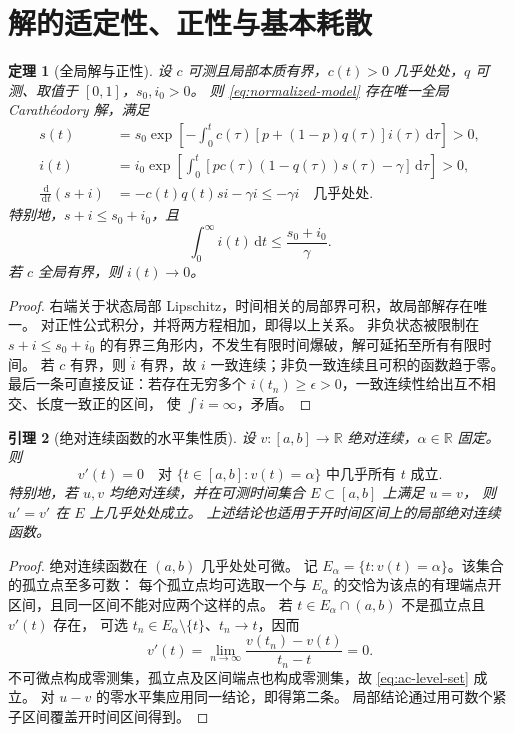 \documentclass[11pt,a4paper,UTF8]{ctexart}
\newtheorem{theorem}{定理}[section]
\newtheorem{lemma}[theorem]{引理}
\theoremstyle{definition}
\newcommand{\R}{\mathbb R}
\newcommand{\dd}{\,\mathrm d}
\begin{document}
\section{解的适定性、正性与基本耗散}
\label{sec:wellposed}
\begin{theorem}[全局解与正性]
\label{thm:wellposed}
设 $c$ 可测且局部本质有界，$c(t)>0$ 几乎处处，$q$ 可测、取值于 $[0,1]$，$s_0,i_0>0$。
则 \eqref{eq:normalized-model} 存在唯一全局 Carath\'eodory 解，满足
\begin{align}
s(t)&=s_0\exp\left[-\int_0^t c(\tau)[p+(1-p)q(\tau)]i(\tau)\dd\tau\right]>0,
\label{eq:s-positive}\\
i(t)&=i_0\exp\left[\int_0^t[pc(\tau)(1-q(\tau))s(\tau)-\gamma]\dd\tau\right]>0,
\label{eq:i-positive}\\
\frac{\dd}{\dd t}(s+i)&=-c(t)q(t)si-\gamma i\le-\gamma i\quad\text{几乎处处}.
\label{eq:sum-decay}
\end{align}
特别地，$s+i\le s_0+i_0$，且
\begin{equation}
\int_0^\infty i(t)\dd t\le\frac{s_0+i_0}{\gamma}.
\label{eq:i-integrable}
\end{equation}
若 $c$ 全局有界，则 $i(t)\to0$。
\end{theorem}
\begin{proof}
右端关于状态局部 Lipschitz，时间相关的局部界可积，故局部解存在唯一。
对正性公式积分，并将两方程相加，即得以上关系。
非负状态被限制在 $s+i\le s_0+i_0$ 的有界三角形内，不发生有限时间爆破，解可延拓至所有有限时间。
若 $c$ 有界，则 $\dot i$ 有界，故 $i$ 一致连续；非负一致连续且可积的函数趋于零。
最后一条可直接反证：若存在无穷多个 $i(t_n)\ge\epsilon>0$，一致连续性给出互不相交、长度一致正的区间，
使 $\int i=\infty$，矛盾。
\end{proof}

\begin{lemma}[绝对连续函数的水平集性质]
\label{lem:ac-level-set}
设 $v:[a,b]\to\R$ 绝对连续，$\alpha\in\R$ 固定。
则
\begin{equation}
v'(t)=0\quad\text{对 }\{t\in[a,b]:v(t)=\alpha\}\text{ 中几乎所有 }t\text{ 成立}.
\label{eq:ac-level-set}
\end{equation}
特别地，若 $u,v$ 均绝对连续，并在可测时间集合 $E\subset[a,b]$ 上满足 $u=v$，
则 $u'=v'$ 在 $E$ 上几乎处处成立。
上述结论也适用于开时间区间上的局部绝对连续函数。
\end{lemma}
\begin{proof}
绝对连续函数在 $(a,b)$ 几乎处处可微。
记 $E_\alpha=\{t:v(t)=\alpha\}$。该集合的孤立点至多可数：
每个孤立点均可选取一个与 $E_\alpha$ 的交恰为该点的有理端点开区间，且同一区间不能对应两个这样的点。
若 $t\in E_\alpha\cap(a,b)$ 不是孤立点且 $v'(t)$ 存在，
可选 $t_n\in E_\alpha\setminus\{t\}$、$t_n\to t$，因而
\[
v'(t)=\lim_{n\to\infty}\frac{v(t_n)-v(t)}{t_n-t}=0.
\]
不可微点构成零测集，孤立点及区间端点也构成零测集，故 \eqref{eq:ac-level-set} 成立。
对 $u-v$ 的零水平集应用同一结论，即得第二条。
局部结论通过用可数个紧子区间覆盖开时间区间得到。
\end{proof}
\end{document}
